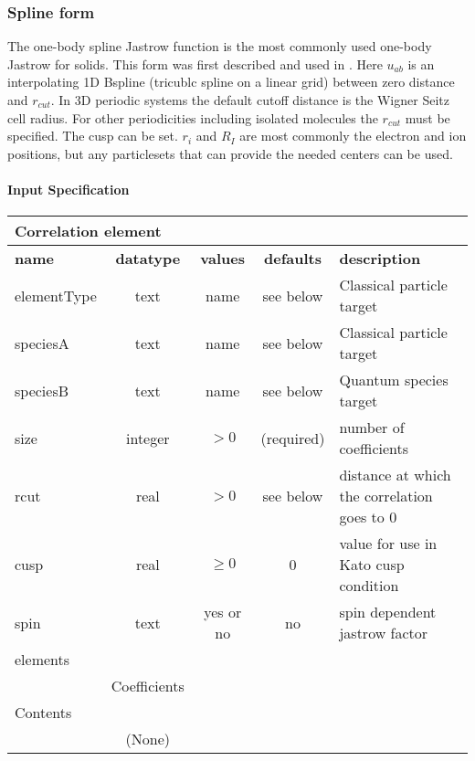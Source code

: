 \subsubsection{Spline form}
\label{sec:onebodyjastrowspline}

The one-body spline Jastrow function is the most commonly used one-body Jastrow for solids. This form 
was first described and used in \cite{EslerKimCeperleyShulenburger2012}.  
Here $u_{ab}$ is an interpolating 1D Bspline (tricublc spline on a linear grid) between zero distance and $r_{cut}$. In 3D periodic systems 
the default cutoff distance is the Wigner Seitz cell radius. For other periodicities including isolated 
molecules the $r_{cut}$ must be specified. The cusp can be set.   $r_i$ 
and $R_I$ are most commonly the electron and ion positions, but any particlesets that can provide the 
needed centers can be used.

\paragraph{Input Specification}
\begin{table}[h]
\begin{center}
\begin{tabular}{l c c c l }
\hline
\multicolumn{5}{l}{Correlation element} \\
\hline
\bfseries name & \bfseries datatype & \bfseries values & \bfseries defaults & \bfseries description \\
\hline
elementType & text & name & see below & Classical particle target  \\
speciesA & text & name & see below & Classical particle target \\
speciesB & text & name & see below & Quantum species target \\
size & integer & $> 0$ & (required) & number of coefficients \\
rcut & real & $> 0$ & see below & distance at which the correlation goes to 0 \\
cusp & real & $\ge 0$ & 0 & value for use in Kato cusp condition \\
spin & text & yes or no & no & spin dependent jastrow factor \\
\hline
\multicolumn{5}{l}{elements}\\ \hline
& Coefficients & & & \\ \hline
\multicolumn{5}{l}{Contents}\\ \hline
& (None)  & & &  \\ \hline
\end{tabular}
\end{center}
\end{table}


